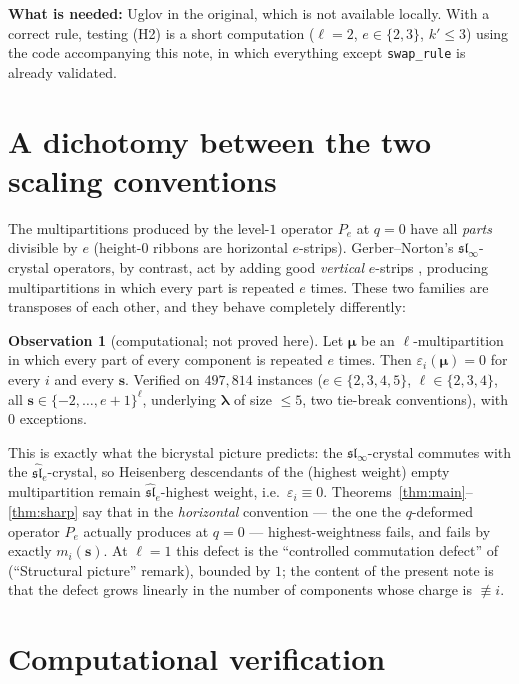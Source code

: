 \documentclass[11pt]{article}
\theoremstyle{definition}
\newtheorem{observation}[theorem]{Observation}
\newcommand{\eps}{\varepsilon}
\newcommand{\bs}{\mathbf{s}}
\newcommand{\blam}{\boldsymbol{\lambda}}
\newcommand{\bmu}{\boldsymbol{\mu}}
\begin{document}
\noindent\textbf{What is needed:} Uglov \cite[Prop.~3.16]{Uglov2000} in
the original, which is not available locally. With a correct rule, testing
(H2) is a short computation ($\ell = 2$, $e \in \{2,3\}$, $k' \le 3$)
using the code accompanying this note, in which everything except
\verb|swap_rule| is already validated.

\section{A dichotomy between the two scaling conventions}\label{sec:dichotomy}

The multipartitions produced by the level-$1$ operator $P_e$ at $q=0$ have
all \emph{parts} divisible by $e$ (height-$0$ ribbons are horizontal
$e$-strips). Gerber--Norton's $\mathfrak{sl}_\infty$-crystal operators, by
contrast, act by adding good \emph{vertical} $e$-strips
\cite[Thm.~1.8]{GN2017}, producing multipartitions in which every part is
repeated $e$ times. These two families are transposes of each other, and
they behave completely differently:

\begin{observation}[computational; not proved here]\label{obs:vertical}
Let $\bmu$ be an $\ell$-multipartition in which every part of every
component is repeated $e$ times. Then $\eps_i(\bmu) = 0$ for every $i$ and
every $\bs$. Verified on $497{,}814$ instances
($e \in \{2,3,4,5\}$, $\ell \in \{2,3,4\}$, all $\bs \in \{-2,\dots,e+1\}^\ell$,
underlying $\blam$ of size $\le 5$, two tie-break conventions), with $0$
exceptions.
\end{observation}

This is exactly what the bicrystal picture predicts: the
$\mathfrak{sl}_\infty$-crystal commutes with the
$\widehat{\mathfrak{sl}}_e$-crystal, so Heisenberg descendants of the
(highest weight) empty multipartition remain
$\widehat{\mathfrak{sl}}_e$-highest weight, i.e.\ $\eps_i \equiv 0$.
Theorems~\ref{thm:main}--\ref{thm:sharp} say that in the \emph{horizontal}
convention --- the one the $q$-deformed operator $P_e$ actually produces
at $q = 0$ --- highest-weightness fails, and fails by exactly
$m_i(\bs)$. At $\ell = 1$ this defect is the ``controlled commutation
defect'' of \cite{Clio-C5-2026-08-11} (``Structural picture'' remark), bounded by $1$; the
content of the present note is that the defect grows linearly in the
number of components whose charge is $\not\equiv i$.

\section{Computational verification}\label{sec:verification}
\end{document}
